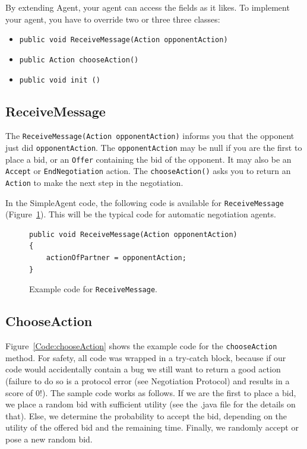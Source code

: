 \documentclass[]{article}
\begin{document}
By extending Agent, your agent can access the fields as it likes.  
To implement your agent, you have to override two or three three classes:

\begin{itemize}
	\item \texttt{public void ReceiveMessage(Action opponentAction)}
	\item \texttt{public Action chooseAction()}
	\item \texttt{public void init ()}
\end{itemize}

\subsection{ReceiveMessage}
The \texttt{ReceiveMessage(Action opponentAction)} informs you that the opponent just did \texttt{opponentAction}. The \texttt{opponentAction} may be null if you are the first to place a bid, or an \texttt{Offer} containing the bid of the opponent. It may also be an \texttt{Accept} or \texttt{EndNegotiation} action.
The \texttt{chooseAction()} asks you to return an \texttt{Action} to make the next step in the negotiation.

In the SimpleAgent code, the following code is available for \texttt{ReceiveMessage} (Figure~\ref{Code:ReceiveMessage}). This will be the typical code for automatic negotiation agents.

\begin{figure}[htb]
\begin{lstlisting}
public void ReceiveMessage(Action opponentAction) 
{
	actionOfPartner = opponentAction;
}
\end{lstlisting}
\caption{Example code for \texttt{ReceiveMessage}.}\label{Code:ReceiveMessage}
\end{figure}

\subsection{ChooseAction}
Figure~\ref{Code:chooseAction} shows the example code for the \texttt{chooseAction} method. For safety, all code was wrapped in a try-catch block, because if our code would accidentally contain a bug we still want to return a good action (failure to do so is a protocol error (see Negotiation Protocol) and results in a score of 0!).
The sample code works as follows. If we are the first to place a bid, we place a random bid with sufficient utility (see the .java file for the details on that). Else, we determine the probability to accept the bid, depending on the utility of the offered bid and the remaining time. Finally, we randomly accept or pose a new random bid.
\end{document}
